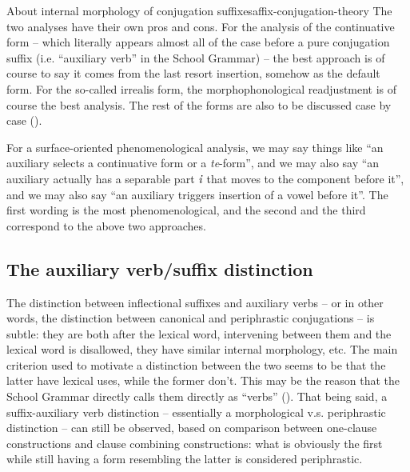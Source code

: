 \documentclass[UTF8, a4paper, oneside, scheme=plain]{ctexrep}
\newcommand{\corpus}[1]{\emph{#1}}
\begin{document}
\begin{theorybox}{About internal morphology of conjugation suffixes}{affix-conjugation-theory}
    The two analyses have their own pros and cons.
    For the analysis of the continuative form 
    -- which literally appears almost all of the case before a pure conjugation suffix
    (i.e. ``auxiliary verb'' in the School Grammar) -- 
    the best approach is of course to say 
    it comes from the last resort insertion, somehow as the default form.
    For the so-called irrealis form,
    the morphophonological readjustment is of course the best analysis.
    The rest of the forms are also to be discussed case by case ().

    For a surface-oriented phenomenological analysis,
    we may say things like ``an auxiliary selects a continuative form or a \corpus{te}-form'',
    and we may also say ``an auxiliary actually has a separable part $\corpus{i}$ 
    that moves to the component before it'',
    and we may also say ``an auxiliary triggers insertion of a vowel before it''.
    The first wording is the most phenomenological,
    and the second and the third correspond to the above two approaches.
\end{theorybox}

\subsection{The auxiliary verb/suffix distinction}

The distinction between inflectional suffixes and auxiliary verbs -- 
or in other words, the distinction between canonical and periphrastic conjugations -- 
is subtle: they are both after the lexical word,
intervening between them and the lexical word is disallowed, 
they have similar internal morphology, etc.
The main criterion used to motivate a distinction between the two 
seems to be that the latter have lexical uses, while the former don't.
This may be the reason that the School Grammar directly calls them directly as ``verbs'' 
().
That being said, a suffix-auxiliary verb distinction 
-- essentially a morphological v.s. periphrastic distinction -- 
can still be observed,
based on comparison between one-clause constructions 
and clause combining constructions:
what is obviously the first while still having a form resembling the latter is considered periphrastic.
\end{document}
